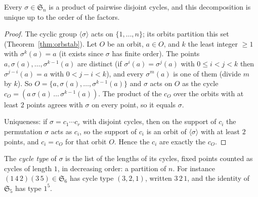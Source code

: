 \begin{proposition}\label{prop:cycles}
Every $\sigma\in\mathfrak S_n$ is a product of pairwise disjoint cycles, and this decomposition is unique up to the order of the factors.
\end{proposition}
\begin{proof}
The cyclic group $\langle\sigma\rangle$ acts on $\{1,\dots,n\}$; its orbits partition this set (Theorem~\ref{thm:orbstab}). Let $O$ be an orbit, $a\in O$, and $k$ the least integer $\ge1$ with $\sigma^k(a)=a$ (it exists since $\sigma$ has finite order). The points $a,\sigma(a),\dots,\sigma^{k-1}(a)$ are distinct (if $\sigma^i(a)=\sigma^j(a)$ with $0\le i<j<k$ then $\sigma^{j-i}(a)=a$ with $0<j-i<k$), and every $\sigma^m(a)$ is one of them (divide $m$ by $k$). So $O=\{a,\sigma(a),\dots,\sigma^{k-1}(a)\}$ and $\sigma$ acts on $O$ as the cycle $c_O=(a\,\sigma(a)\,\dots\,\sigma^{k-1}(a))$. The product of the $c_O$ over the orbits with at least $2$ points agrees with $\sigma$ on every point, so it equals $\sigma$.

Uniqueness: if $\sigma=c_1\cdots c_r$ with disjoint cycles, then on the support of $c_i$ the permutation $\sigma$ acts as $c_i$, so the support of $c_i$ is an orbit of $\langle\sigma\rangle$ with at least $2$ points, and $c_i=c_O$ for that orbit $O$. Hence the $c_i$ are exactly the $c_O$.
\end{proof}

The \emph{cycle type} of $\sigma$ is the list of the lengths of its cycles, fixed points counted as cycles of length $1$, in decreasing order: a partition of $n$. For instance $(1\,4\,2)(3\,5)\in\mathfrak S_6$ has cycle type $(3,2,1)$, written $3\,2\,1$, and the identity of $\mathfrak S_5$ has type $1^5$.

